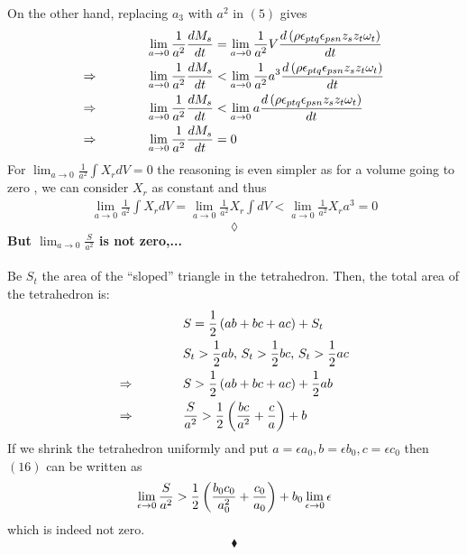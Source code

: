 On the other hand, replacing $a_3$ with $a^2$ in $(5)$ gives 
\begin{align}
&\lim_{a \to 0} \frac{1}{a^2}\dv{M_s}{t} = \lim_{a \to 0}\frac{1}{a^2}V\dv{\left(\rho\epsilon_{ptq}\epsilon_{psn}z_sz_t\omega_t\right)}{t} \\
\Rightarrow\quad\quad\quad\quad &\lim_{a \to 0} \frac{1}{a^2}\dv{M_s}{t} < \lim_{a \to 0}\frac{1}{a^2}a^3\dv{\left(\rho\epsilon_{ptq}\epsilon_{psn}z_sz_t\omega_t\right)}{t} \\
\Rightarrow\quad\quad\quad\quad &\lim_{a \to 0} \frac{1}{a^2}\dv{M_s}{t} < \lim_{a \to 0}a\dv{\left(\rho\epsilon_{ptq}\epsilon_{psn}z_sz_t\omega_t\right)}{t}\\
\Rightarrow\quad\quad\quad\quad &\lim_{a \to 0} \frac{1}{a^2}\dv{M_s}{t} =0
\end{align}
For $ \displaystyle \lim_{a \to 0} \frac{1}{a^2} \int X_rdV=0$ the reasoning is even simpler as for a volume going to zero , we can consider $X_r$ as constant and thus 
\begin{align}
 \displaystyle \lim_{a \to 0} \frac{1}{a^2} \int X_rdV=\displaystyle \lim_{a \to 0} \frac{1}{a^2}  X_r \int dV < \displaystyle \lim_{a \to 0} \frac{1}{a^2}  X_r a^3 = 0
\end{align}
$$\lozenge$$
\textbf{But  $\displaystyle \lim_{a \to 0} \frac{S}{a^2}$ is not zero,...}\\\\
Be $S_t$ the area of the ``sloped'' triangle in the tetrahedron. Then, the total area of the tetrahedron is:
\begin{align}
&S= \frac{1}{2}\left(ab + bc + ac \right) + S_t\\
&S_t > \frac{1}{2} ab\text{,   }S_t > \frac{1}{2} bc\text{,   }S_t > \frac{1}{2} ac\\
\Rightarrow \quad\quad\quad\quad & S>  \frac{1}{2}\left(ab + bc + ac \right) + \frac{1}{2} ab\\
\Rightarrow \quad\quad\quad\quad & \frac{S}{a^2}>  \frac{1}{2}\left( \frac{bc}{a^2} + \frac{c}{a} \right) + b
\end{align}
If we shrink the tetrahedron uniformly and put $a=\epsilon a_0, b=\epsilon b_0, c=\epsilon c_0$ then $(16)$ can be written as 
\begin{align}
\lim_{\epsilon \to 0}\frac{S}{a^2}>   \frac{1}{2}\left( \frac{b_0c_0}{a_0^2} + \frac{c_0}{a_0} \right) + b_0\lim_{\epsilon \to 0}\epsilon 
\end{align}
which is indeed not zero.
 $$\blacklozenge$$
\newpage

